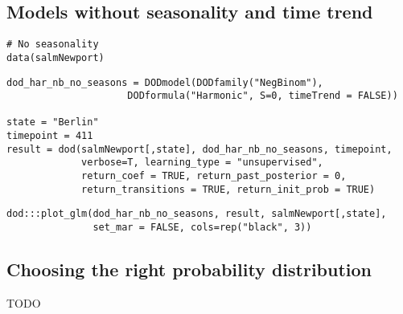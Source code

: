 \documentclass[a4paper]{article}\usepackage[]{graphicx}\usepackage[]{color}
\makeatletter
\newenvironment{kframe}{%
 \def\at@end@of@kframe{}%
 \ifinner\ifhmode%
  \def\at@end@of@kframe{\end{minipage}}%
  \begin{minipage}{\columnwidth}%
 \fi\fi%
 \def\FrameCommand##1{\hskip\@totalleftmargin \hskip-\fboxsep
 \colorbox{shadecolor}{##1}\hskip-\fboxsep
     \hskip-\linewidth \hskip-\@totalleftmargin \hskip\columnwidth}%
 \MakeFramed {\advance\hsize-\width
   \@totalleftmargin\z@ \linewidth\hsize
   \@setminipage}}%
 {\par\unskip\endMakeFramed%
 \at@end@of@kframe}
\newenvironment{knitrout}{}{} %
\makeatother
\begin{document}
\subsection{Models without seasonality and time trend}


\begin{knitrout}
\color{fgcolor}\begin{kframe}
\begin{verbatim}
# No seasonality
data(salmNewport)
\end{verbatim}


{\ttfamily\noindent\color{warningcolor}{\#\# Warning in data(salmNewport): data set 'salmNewport' not found}}\begin{verbatim}
dod_har_nb_no_seasons = DODmodel(DODfamily("NegBinom"),
                     DODformula("Harmonic", S=0, timeTrend = FALSE))

state = "Berlin"
timepoint = 411
result = dod(salmNewport[,state], dod_har_nb_no_seasons, timepoint, 
             verbose=T, learning_type = "unsupervised",
             return_coef = TRUE, return_past_posterior = 0,
             return_transitions = TRUE, return_init_prob = TRUE)
\end{verbatim}


{\ttfamily\noindent{}}

{\ttfamily\noindent\bfseries\color{errorcolor}{\#\# Error in 1:nrow(result): argument of length 0}}\begin{verbatim}
dod:::plot_glm(dod_har_nb_no_seasons, result, salmNewport[,state], 
               set_mar = FALSE, cols=rep("black", 3))
\end{verbatim}


{\ttfamily\noindent\bfseries{}}\end{kframe}
\end{knitrout}


\subsection{Choosing the right probability distribution}
TODO
\end{document}
